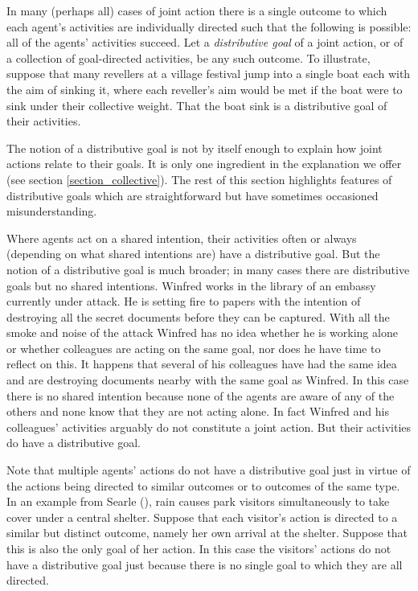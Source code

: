\documentclass[12pt,a4paper]{extarticle}
\begin{document}
In many (perhaps all) cases of joint action there is a single outcome to which each agent's activities are individually directed such that the following is possible: all of the agents' activities succeed.  
Let a \emph{distributive goal} of a joint action, or of a collection of goal-directed activities, be any such outcome.  
To illustrate, suppose that many revellers at a village festival jump into a single boat each with the aim of sinking it, where each reveller's aim would be met if the boat were to sink under their collective weight.  
That the boat sink is a distributive goal of their activities.

The notion of a distributive goal is not by itself enough to explain how joint actions relate to their goals.  
It is only one ingredient in the explanation we offer (see section \vref{section_collective}).  
The rest of this section highlights features of distributive goals which are  straightforward  but have sometimes occasioned misunderstanding.

Where agents act on a shared intention, their activities often or always (depending on what shared intentions are) have a distributive goal.  
But the notion of a distributive goal is much broader; in many cases there are distributive goals but no shared intentions.
Winfred works in the library of an embassy currently under attack.  
He is setting fire to papers with the intention of destroying all the secret documents before they can be captured.
With all the smoke and  noise of the attack Winfred has no idea whether he is working alone or whether colleagues are acting on the same goal, nor does he have time to reflect on this.
It happens that several of his colleagues have had the same idea and are destroying documents nearby with the same goal as Winfred.
In this case there is no shared intention because none of the agents are aware of any of the others and none know that they are not acting alone.
In fact Winfred and his colleagues' activities arguably do not constitute a joint action.
But their activities do have a distributive goal.


Note that multiple agents' actions do not have a distributive goal just in virtue of the actions being directed to similar outcomes or to outcomes of the same type.  In an example from Searle (\citeyear[p.\ 92]{Searle:1990em}), rain causes park visitors simultaneously to take cover under a central shelter.  Suppose that each visitor's action is directed to a similar but distinct outcome, namely her own arrival at the shelter.  Suppose that this is also the only goal of her action.  In this case the visitors' actions do not have a distributive goal just because there is no single goal to which they are all directed.
\end{document}
